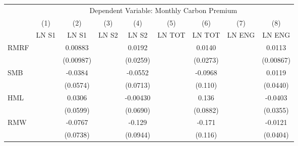 {
\def\sym#1{\ifmmode^{#1}\else\(^{#1}\)\fi}
\begin{tabular}{l*{8}{c}}
\hline\hline
                    &\multicolumn{8}{c}{Dependent Variable: Monthly Carbon Premium}                                                                                                                 \\\cmidrule(lr){2-9}
                    &\multicolumn{1}{c}{(1)}&\multicolumn{1}{c}{(2)}&\multicolumn{1}{c}{(3)}&\multicolumn{1}{c}{(4)}&\multicolumn{1}{c}{(5)}&\multicolumn{1}{c}{(6)}&\multicolumn{1}{c}{(7)}&\multicolumn{1}{c}{(8)}\\
                    &\multicolumn{1}{c}{LN S1}&\multicolumn{1}{c}{LN S1}&\multicolumn{1}{c}{LN S2}&\multicolumn{1}{c}{LN S2}&\multicolumn{1}{c}{LN TOT}&\multicolumn{1}{c}{LN TOT}&\multicolumn{1}{c}{LN ENG}&\multicolumn{1}{c}{LN ENG}\\
\hline
RMRF                &                     &     0.00883         &                     &      0.0192         &                     &      0.0140         &                     &      0.0113         \\
                    &                     &   (0.00987)         &                     &    (0.0259)         &                     &    (0.0273)         &                     &   (0.00867)         \\
SMB                 &                     &     -0.0384         &                     &     -0.0552         &                     &     -0.0968         &                     &      0.0119         \\
                    &                     &    (0.0574)         &                     &    (0.0713)         &                     &     (0.110)         &                     &    (0.0440)         \\
HML                 &                     &      0.0306         &                     &    -0.00430         &                     &       0.136         &                     &     -0.0403         \\
                    &                     &    (0.0599)         &                     &    (0.0690)         &                     &    (0.0882)         &                     &    (0.0355)         \\
RMW                 &                     &     -0.0767         &                     &      -0.129         &                     &      -0.171         &                     &     -0.0121         \\
                    &                     &    (0.0738)         &                     &    (0.0944)         &                     &     (0.116)         &                     &    (0.0404)         \\

\end{tabular}}
